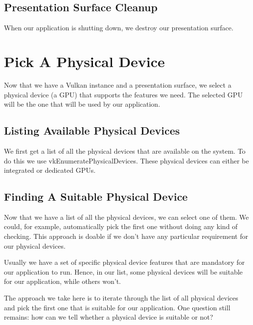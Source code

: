 \subsection{Presentation Surface Cleanup}

When our application is shutting down, we destroy our presentation surface.

\begin{minipage}{\linewidth}{\noindent}
    
\end{minipage}

\section{Pick A Physical Device}

Now that we have a Vulkan instance and a presentation surface, we select
a physical device (a GPU) that supports the features we need.
The selected GPU will be the one that will be used by our application.

\subsection{Listing Available Physical Devices}

We first get a list of all the physical devices that are available on the
system.
To do this we use vkEnumeratePhysicalDevices.
These physical devices can either be integrated or dedicated GPUs.

\subsection{Finding A Suitable Physical Device}

Now that we have a list of all the physical devices, we can select one of them.
We could, for example, automatically pick the first one without doing any kind
of checking.
This approach is doable if we don't have any particular requirement for our
physical devices.

Usually we have a set of specific physical device features that are mandatory
for our application to run.
Hence, in our list, some physical devices will be suitable for our application, while
others won't.

The approach we take here is to iterate through the list of all physical devices and
pick the first one that is suitable for our application.
One question still remains: how can we tell whether a physical device is suitable or not?

